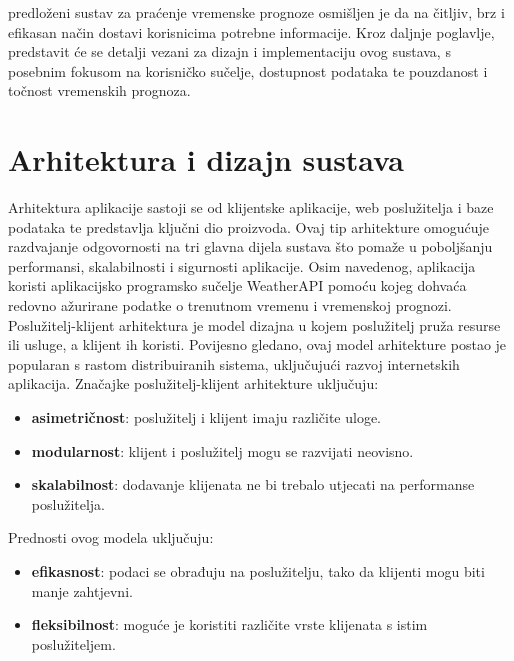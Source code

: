 \documentclass[times, utf8, zavrsni]{fer}
\begin{document}
predloženi sustav za praćenje vremenske prognoze osmišljen je da na čitljiv, brz i efikasan način dostavi korisnicima potrebne informacije. Kroz daljnje poglavlje, predstavit će se detalji vezani za dizajn i implementaciju ovog sustava, s posebnim fokusom na korisničko sučelje, dostupnost podataka te pouzdanost i točnost vremenskih prognoza.


\chapter{Arhitektura i dizajn sustava}
Arhitektura aplikacije sastoji se od klijentske aplikacije, web poslužitelja i baze podataka te predstavlja ključni dio proizvoda. Ovaj tip arhitekture omogućuje razdvajanje odgovornosti na tri glavna dijela sustava što pomaže u poboljšanju performansi, skalabilnosti i sigurnosti aplikacije. Osim navedenog, aplikacija koristi aplikacijsko programsko sučelje WeatherAPI pomoću kojeg dohvaća redovno ažurirane podatke o trenutnom vremenu i vremenskoj prognozi. Poslužitelj-klijent arhitektura je model dizajna u kojem poslužitelj pruža resurse ili usluge, a klijent ih koristi. Povijesno gledano, ovaj model arhitekture postao je popularan s rastom distribuiranih sistema, uključujući razvoj internetskih aplikacija. Značajke poslužitelj-klijent arhitekture uključuju:
\begin{itemize}
    \item \textbf{asimetričnost}: poslužitelj i klijent imaju različite uloge.
    \item \textbf{modularnost}: klijent i poslužitelj mogu se razvijati neovisno.
    \item \textbf{skalabilnost}: dodavanje klijenata ne bi trebalo utjecati na performanse poslužitelja.
\end{itemize}
Prednosti ovog modela uključuju:
\begin{itemize}
    \item \textbf{efikasnost}: podaci se obrađuju na poslužitelju, tako da klijenti mogu biti manje zahtjevni.
    \item \textbf{fleksibilnost}: moguće je koristiti različite vrste klijenata s istim poslužiteljem.
\end{itemize}
\end{document}
